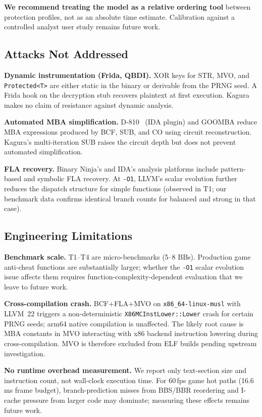 \documentclass[conference]{IEEEtran}
\begin{document}
\textbf{We recommend treating the model as a relative ordering tool}
between protection profiles, not as an absolute time estimate.
Calibration against a controlled analyst user study remains future work.

\subsection{Attacks Not Addressed}

\textbf{Dynamic instrumentation (Frida, QBDI).}
XOR keys for STR, MVO, and \texttt{Protected\textless T\textgreater}
are either static in the binary or derivable from the PRNG seed.
A Frida hook on the decryption stub recovers plaintext at first
execution.
Kagura makes no claim of resistance against dynamic analysis.

\textbf{Automated MBA simplification.}
D-810~\cite{liu2017d810} (IDA plugin) and GOOMBA reduce MBA expressions
produced by BCF, SUB, and CO using circuit reconstruction.
Kagura's multi-iteration SUB raises the circuit depth but does not
prevent automated simplification.

\textbf{FLA recovery.}
Binary Ninja's and IDA's analysis platforms include pattern-based and
symbolic FLA recovery.
At \texttt{-O1}, LLVM's scalar evolution further reduces the dispatch
structure for simple functions (observed in T1; our benchmark data
confirms identical branch counts for balanced and strong in that case).

\subsection{Engineering Limitations}

\textbf{Benchmark scale.}
T1--T4 are micro-benchmarks (5--8 BBs).
Production game anti-cheat functions are substantially larger; whether
the \texttt{-O1} scalar evolution issue affects them requires
function-complexity-dependent evaluation that we leave to future work.

\textbf{Cross-compilation crash.}
BCF+FLA+MVO on \texttt{x86\_64-linux-musl} with LLVM~22 triggers a
non-deterministic \texttt{X86MCInstLower::Lower} crash for certain
PRNG seeds; arm64 native compilation is unaffected.
The likely root cause is MBA constants in MVO interacting with x86
backend instruction lowering during cross-compilation.
MVO is therefore excluded from ELF builds pending upstream investigation.

\textbf{No runtime overhead measurement.}
We report only text-section size and instruction count, not wall-clock
execution time.
For 60\,fps game hot paths (16.6\,ms frame budget), branch-prediction
misses from BBS/BBR reordering and I-cache pressure from larger code
may dominate; measuring these effects remains future work.
\end{document}
